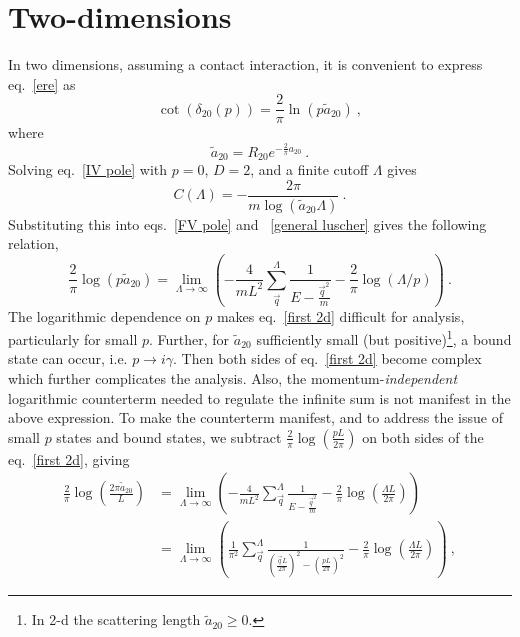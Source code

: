 \section{Two-dimensions}\label{sec:2D}
In two dimensions, assuming a contact interaction, it is convenient to express eq.~\eqref{ere} as
\begin{equation}
\cot \left(\delta_{20}(p)\right)=\frac{2}{\pi}  \ln \left(p \tilde a_{20}\right)\ ,
\end{equation}
where
\begin{equation}
\tilde a_{20}=R_{20}e^{-\frac{2}{\pi}a_{20}}\ .
\end{equation}
Solving eq.~\eqref{IV pole} with $p=0$, $D=2$, and a finite cutoff $\Lambda$ gives
\begin{equation}\label{eq:C2}
C(\Lambda)=-\frac{2 \pi}{m \log \left(\tilde a_{20} \Lambda\right)}\ .
\end{equation}
Substituting this into eqs.~\eqref{FV pole} and ~\eqref{general luscher} gives the following relation,
\begin{equation}\label{eq:first 2d}
\frac{2}{\pi} \log \left(p\tilde a_{20}\right)=\lim_{\Lambda\to\infty}\left(-\frac{4}{m L^{2}} \sum_{\vec{q}}^{\Lambda} \frac{1}{E-\frac{\vec{q}^{2}}{m}}-\frac{2}{\pi} \log (\Lambda / p)\right)\ .
\end{equation}
The logarithmic dependence on $p$ makes eq.~\eqref{first 2d} difficult for analysis, particularly for small $p$.  Further, for $\tilde a_{20}$ sufficiently small (but positive)\footnote{ In 2-d the scattering length $\tilde a_{20}\ge 0$\cite{}.}, a bound state can occur, i.e. $p\to i\gamma$.  Then both sides of eq.~\eqref{first 2d} become complex which further complicates the analysis.   Also, the momentum-\emph{independent} logarithmic counterterm needed to regulate the infinite sum is not manifest in the above expression.  To make the counterterm manifest, and to address the issue of small $p$ states and bound states, we subtract $\frac{2}{\pi}\log\left(\frac{pL}{2\pi}\right)$ on both sides of the eq.~\eqref{first 2d}, giving
\begin{align}
\frac{2}{\pi} \log \left(\frac{2\pi \tilde a_{20}}{L}\right)&=\lim_{\Lambda\to\infty}\left(-\frac{4}{m L^{2}} \sum_{\vec{q}}^{\Lambda} \frac{1}{E-\frac{\vec{q}^{2}}{m}}-\frac{2}{\pi} \log \left(\frac{\Lambda L}{2\pi}\right)\right)\nonumber\\
&=\lim_{\Lambda\to\infty}\left(\frac{1}{\pi^2} \sum_{\vec{q}}^{\Lambda} \frac{1}{\left(\frac{\vec{q}L}{2\pi}\right)^2-\left(\frac{pL}{2\pi}\right)^2}-\frac{2}{\pi} \log \left(\frac{\Lambda L}{2\pi}\right)\right)\ ,\label{eq:second 2d}
\end{align}
